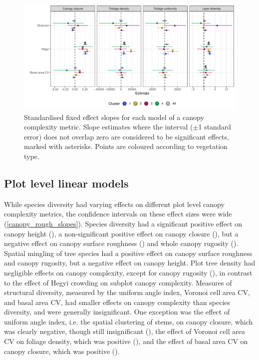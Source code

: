 \documentclass[11pt,a4paper]{article}
\begin{document}
\begin{figure}
	\includegraphics[width=\linewidth]{height_profile_mod_rich_slopes_sites}
	\caption{Standardised fixed effect slopes for each model of a canopy complexity metric. Slope estimates where the interval ($\pm$1 standard error) does not overlap zero are considered to be significant effects, marked with asterisks. Points are coloured according to vegetation type.}
	\label{height_profile_mod_rich_slopes_sites}
\end{figure}



\subsection{Plot level linear models}

While species diversity had varying effects on different plot level canopy complexity metrics, the confidence intervals on these effect sizes were wide (\autoref{canopy_rough_slopes}). Species diversity had a significant positive effect on canopy height (\shannonHeightP{}), a non-significant positive effect on canopy closure (\shannonCoverP{}), but a negative effect on canopy surface roughness (\shannonRoughP{}) and whole canopy rugosity (\shannonRugP{}). Spatial mingling of tree species had a positive effect on canopy surface roughness and canopy rugosity, but a negative effect on canopy height. Plot tree density had negligible effects on canopy complexity, except for canopy rugosity (\treeDensRugP{}), in contrast to the effect of Hegyi crowding on subplot canopy complexity. Measures of structural diversity, measured by the uniform angle index, Voronoi cell area CV, and basal area CV, had smaller effects on canopy complexity than species diversity, and were generally insignificant. One exception was the effect of uniform angle index, i.e. the spatial clustering of stems, on canopy closure, which was clearly negative, though still insignificant (\wiCoverP{}), the effect of Voronoi cell area CV on foliage density, which was positive (\voronoiDensP{}), and the effect of basal area CV on canopy closure, which was positive (\baCoverP{}). 
\end{document}
